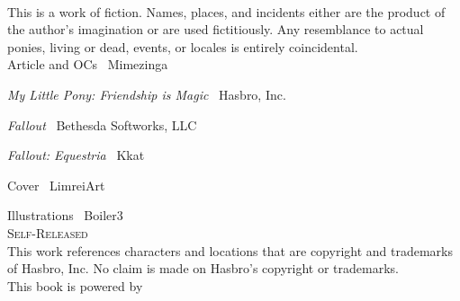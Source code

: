 \newpage

~\vfill

\thispagestyle{empty}

\noindent This is a work of fiction. Names, places, and incidents either are the product of the author's imagination or are used fictitiously. Any resemblance to actual ponies, living or dead, events, or locales is entirely coincidental.\\

\noindent Article and OCs \textcopyright\ Mimezinga

\noindent \emph{My Little Pony: Friendship is Magic} \textcopyright\ Hasbro, Inc.

\noindent \emph{Fallout} \textcopyright\ Bethesda Softworks, LLC

\noindent \emph{Fallout: Equestria} \textcopyright\ Kkat

\noindent Cover \textcopyright\ LimreiArt

\noindent Illustrations \textcopyright\ Boiler3 \\

\noindent \textsc{Self-Released}\\

\noindent This work references characters and locations that are copyright and trademarks of Hasbro, Inc. No claim is made on Hasbro's copyright or trademarks.\\

\noindent This book is powered by \XeLaTeX{}


